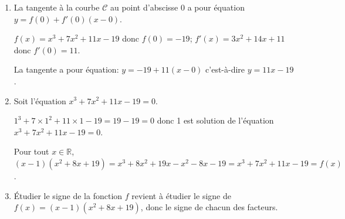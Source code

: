 \documentclass[10pt]{article}
\providecommand{\R}{\mathbb{R}}
\begin{document}
\begin{enumerate}
On établit le tableau de variations de la fonction $f$.

\begin{center}
{\renewcommand{\arraystretch}{1.3}
\def\esp{\hspace*{1.5cm}}
\def\hauteur{20pt}
$\begin{array}{|c| *6{c} c|}
\hline
 x & -\infty & \esp & -\frac{11}{3} & \esp & -1 & \esp & +\infty \\
 \hline
f'(x) &  &  \pmb{+} & \vline\hspace{-2.7pt}0 & \pmb{-} & \vline\hspace{-2.7pt}0 & \pmb{+} & \\  
\hline
  &  &  & \Rnode{max1}{\approx -14,52} & & & &  \Rnode{max2}{~} \\
f (x) & &  & & & & & \rule{0pt}{\hauteur}\\
 & \Rnode{min1}{~} & & & & \Rnode{min2}{-24} & & \rule{0pt}{\hauteur} 
\ncline{->}{min1}{max1} 
\ncline{->}{max1}{min2}
\ncline{->}{min2}{max2} \\
\hline
\end{array}$
}
\end{center}


\item La tangente à la courbe $\mathcal{C}$ au point d'abscisse $0$ a pour équation
$y=f(0) + f'(0)\left (x-0\right )$.

$f(x)=x^3 + 7x^2 +11x - 19 $ donc $f(0)=-19$; $f'(x)=3x^2+14x+11$ donc $f'(0)=11$.

La tangente a pour équation: $y = -19 + 11\left (x-0\right )$ c'est-à-dire $y = 11x-19$.

\item Soit l'équation $x^3 + 7x^2 +11x - 19 = 0$.

$1^3 +7\times 1^2 +11\times 1 - 19 = 19-19=0$ donc 1 est solution de l'équation $x^3 + 7x^2 +11x - 19 = 0$.

\smallskip

Pour tout $x\in\R$, $(x-1)(x^2+8x+19) = x^3+8x^2+19x -x^2 -8x-19=x^3 +7x^2 +11x-19 = f(x)$.



\item Étudier le signe de la fonction $f$ revient à étudier le signe de $f(x)=(x-1)(x^2+8x+19)$, donc le signe de chacun des facteurs.

\end{enumerate}
\end{document}
